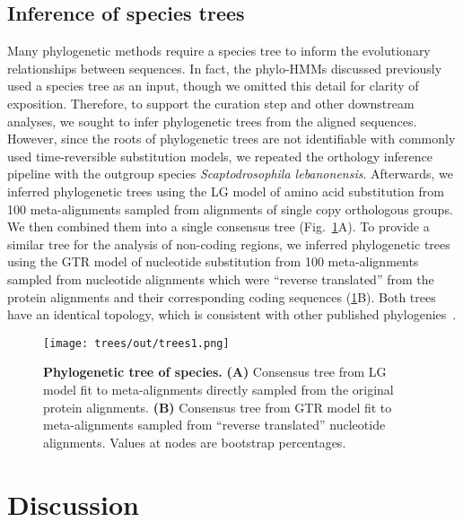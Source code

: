 \subsection{Inference of species trees}
Many phylogenetic methods require a species tree to inform the evolutionary relationships between sequences. In fact, the phylo-HMMs discussed previously used a species tree as an input, though we omitted this detail for clarity of exposition. Therefore, to support the curation step and other downstream analyses, we sought to infer phylogenetic trees from the aligned sequences. However, since the roots of phylogenetic trees are not identifiable with commonly used time-reversible substitution models, we repeated the orthology inference pipeline with the outgroup species \textit{Scaptodrosophila lebanonensis}. Afterwards, we inferred phylogenetic trees using the LG model of amino acid substitution from 100 meta-alignments sampled from alignments of single copy orthologous groups. We then combined them into a single consensus tree (Fig.~\ref{fig:trees}A). To provide a similar tree for the analysis of non-coding regions, we inferred phylogenetic trees using the GTR model of nucleotide substitution from 100 meta-alignments sampled from nucleotide alignments which were ``reverse translated'' from the protein alignments and their corresponding coding sequences (\ref{fig:trees}B). Both trees have an identical topology, which is consistent with other published phylogenies~\cite{D12GC2007, DaLage2007}.

\begin{figure}[h!]
\texttt{[image: trees/out/trees1.png]}
\centering
\caption{\textbf{Phylogenetic tree of species.}
\textbf{(A)} Consensus tree from LG model fit to meta-alignments directly sampled from the original protein alignments. \textbf{(B)} Consensus tree from GTR model fit to meta-alignments sampled from ``reverse translated'' nucleotide alignments. Values at nodes are bootstrap percentages.}
\label{fig:trees}
\end{figure}

\section{Discussion}
